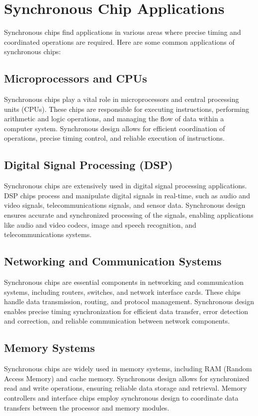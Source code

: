 \documentclass[a4paper,11pt]{report}
\begin{document}
\chapter{Synchronous Chip Applications}

Synchronous chips find applications in various areas where precise timing and coordinated operations are required. Here are some common applications of synchronous chips: 

\section{Microprocessors and CPUs}
Synchronous chips play a vital role in microprocessors and central processing units (CPUs). These chips are responsible for executing instructions, performing arithmetic and logic operations, and managing the flow of data within a computer system. Synchronous design allows for efficient coordination of operations, precise timing control, and reliable execution of instructions.
	
\section{Digital Signal Processing (DSP)}
Synchronous chips are extensively used in digital signal processing applications. DSP chips process and manipulate digital signals in real-time, such as audio and video signals, telecommunications signals, and sensor data. Synchronous design ensures accurate and synchronized processing of the signals, enabling applications like audio and video codecs, image and speech recognition, and telecommunications systems.

\section{Networking and Communication Systems}
Synchronous chips are essential components in networking and communication systems, including routers, switches, and network interface cards. These chips handle data transmission, routing, and protocol management. Synchronous design enables precise timing synchronization for efficient data transfer, error detection and correction, and reliable communication between network components.

\section{Memory Systems}

Synchronous chips are widely used in memory systems, including RAM (Random Access Memory) and cache memory. Synchronous design allows for synchronized read and write operations, ensuring reliable data storage and retrieval. Memory controllers and interface chips employ synchronous design to coordinate data transfers between the processor and memory modules.
\end{document}
